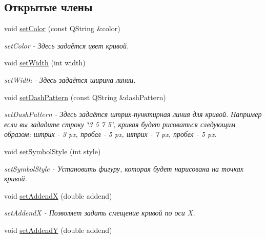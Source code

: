 \subsection*{Открытые члены}
\begin{DoxyCompactItemize}
\item 
void \hyperlink{classCurveProCreator_a90b1f531a4059b8dc4ccbe5a9a17ef65}{set\-Color} (const \-Q\-String \&color)
\begin{DoxyCompactList}\small\item\em set\-Color -\/ Здесь задаётся цвет кривой. \end{DoxyCompactList}\item 
\hypertarget{classCurveProCreator_a61a75fe3cc91ae3a5b2cc92b7753930a}{void \hyperlink{classCurveProCreator_a61a75fe3cc91ae3a5b2cc92b7753930a}{set\-Width} (int width)}\label{classCurveProCreator_a61a75fe3cc91ae3a5b2cc92b7753930a}

\begin{DoxyCompactList}\small\item\em set\-Width -\/ Здесь задаётся ширина линии. \end{DoxyCompactList}\item 
void \hyperlink{classCurveProCreator_aa29b6611f233a0c3e42c513154c885af}{set\-Dash\-Pattern} (const \-Q\-String \&dash\-Pattern)
\begin{DoxyCompactList}\small\item\em set\-Dash\-Pattern -\/ Здесь задаётся штрих-\/пунктирная линия для кривой. Например если вы зададите строку \char`\"{}3 5 7 5\char`\"{}, кривая будет рисоваться следующим образом\-: штрих -\/ 3 px, пробел -\/ 5 px, штрих -\/ 7 px, пробел -\/ 5 px. \end{DoxyCompactList}\item 
void \hyperlink{classCurveProCreator_ae8e463e9680509d19c3d3de6c0bad98f}{set\-Symbol\-Style} (int style)
\begin{DoxyCompactList}\small\item\em set\-Symbol\-Style -\/ Установить фигуру, которая будет нарисована на точках кривой. \end{DoxyCompactList}\item 
\hypertarget{classCurveProCreator_a3be6f39528fb1906adc2e2c4f893b38a}{void \hyperlink{classCurveProCreator_a3be6f39528fb1906adc2e2c4f893b38a}{set\-Addend\-X} (double addend)}\label{classCurveProCreator_a3be6f39528fb1906adc2e2c4f893b38a}

\begin{DoxyCompactList}\small\item\em set\-Addend\-X -\/ Позволяет задать смещение кривой по оси \-X. \end{DoxyCompactList}\item 
\hypertarget{classCurveProCreator_afb25fc5c1691980a10bed6cd5d7dea2d}{void \hyperlink{classCurveProCreator_afb25fc5c1691980a10bed6cd5d7dea2d}{set\-Addend\-Y} (double addend)}\label{classCurveProCreator_afb25fc5c1691980a10bed6cd5d7dea2d}


\end{DoxyCompactItemize}
